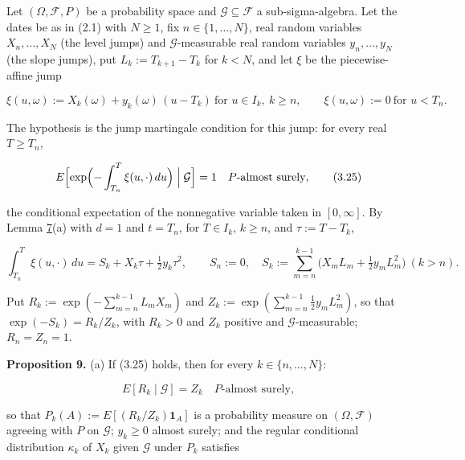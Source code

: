 \documentclass[11pt]{article}
\begin{document}
Let \((\Omega, \mathcal F, P)\) be a probability space and \(\mathcal G \subseteq \mathcal F\) a sub-sigma-algebra. Let the dates be as in (2.1) with \(N \ge 1\), fix \(n \in \{1, \dots, N\}\), real random variables \(X_n, \dots, X_N\) (the level jumps) and \(\mathcal G\)-measurable real random variables \(y_n, \dots, y_N\) (the slope jumps), put \(L_k := T_{k+1} - T_k\) for \(k < N\), and let \(\xi\) be the piecewise-affine jump

\begin{equation*}
\xi(u, \omega) := X_k(\omega) + y_k(\omega)\,(u - T_k) \ \text{for } u \in I_k,\ k \ge n, \qquad \xi(u, \omega) := 0 \ \text{for } u < T_n. \tag{3.24}\label{eq:3.24}
\end{equation*}

The hypothesis is the jump martingale condition for this jump: for every real \(T \ge T_n\),

\begin{equation*}
E\Bigl[ \exp\Bigl( -\int_{T_n}^T \xi(u, \cdot)\,du \Bigr) \Bigm| \mathcal G \Bigr] = 1 \quad P\text{-almost surely}, \tag{3.25}\label{eq:3.25}
\end{equation*}

the conditional expectation of the nonnegative variable taken in \([0, \infty]\). By Lemma \hyperref[res:Lemma-7]{7}(a) with \(d = 1\) and \(t = T_n\), for \(T \in I_k\), \(k \ge n\), and \(\tau := T - T_k\),

\begin{equation*}
\int_{T_n}^T \xi(u, \cdot)\,du = S_k + X_k \tau + \tfrac12 y_k \tau^2, \qquad S_n := 0, \quad S_k := \sum_{m=n}^{k-1} \bigl( X_m L_m + \tfrac12 y_m L_m^2 \bigr) \ (k > n). \tag{3.26}\label{eq:3.26}
\end{equation*}

Put \(R_k := \exp(-\sum_{m=n}^{k-1} L_m X_m)\) and \(Z_k := \exp(\sum_{m=n}^{k-1} \tfrac12 y_m L_m^2)\), so that \(\exp(-S_k) = R_k / Z_k\), with \(R_k > 0\) and \(Z_k\) positive and \(\mathcal G\)-measurable; \(R_n = Z_n = 1\).

\label{res:Proposition-9}
\textbf{Proposition 9.} (a) If (3.25) holds, then for every \(k \in \{n, \dots, N\}\):

\begin{equation*}
E[R_k \mid \mathcal G] = Z_k \quad P\text{-almost surely}, \tag{3.27}\label{eq:3.27}
\end{equation*}

so that \(P_k(A) := E[(R_k / Z_k) \mathbf 1_A]\) is a probability measure on \((\Omega, \mathcal F)\) agreeing with \(P\) on \(\mathcal G\); \(y_k \ge 0\) almost surely; and the regular conditional distribution \(\kappa_k\) of \(X_k\) given \(\mathcal G\) under \(P_k\) satisfies
\end{document}
